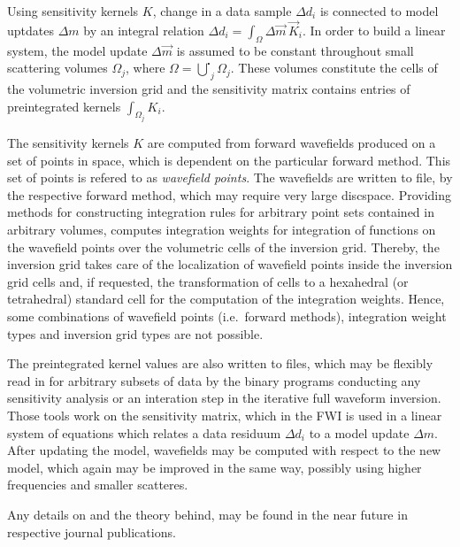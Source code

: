 Using sensitivity kernels $K$, change in a data sample $\Delta d_i$ is connected to model uptdates $\Delta m$ by 
an integral relation $\Delta d_i = \int_{\Omega} \Delta \vec{m} \, \vec{K}_i$. In order to build a linear 
system, the model update $\Delta \vec{m}$ is assumed to be constant throughout small scattering volumes 
$\Omega_j$, where $\Omega = \overset{\centerdot}{\bigcup}_j \Omega_j$. These volumes constitute the cells of the volumetric 
inversion grid and the sensitivity matrix contains entries of preintegrated kernels $\int_{\Omega_j} K_i$.

The sensitivity kernels $K$ are computed from forward wavefields produced on a set of points in space, which
is dependent on the particular forward method. This set of points is refered to as \emph{wavefield points}. The 
wavefields are written to file, by the respective forward method, which may require very large discspace. 
Providing methods for constructing integration rules for arbitrary point sets contained in arbitrary volumes, 
\ASKI computes integration weights for integration of functions on the wavefield points over the volumetric
cells of the inversion grid. Thereby, the inversion grid takes care of the localization of wavefield points 
inside the inversion grid cells and, if requested, the transformation of cells to a hexahedral (or tetrahedral) standard 
cell for the computation of the integration weights. Hence, some combinations of wavefield points (i.e.\ 
forward methods), integration weight types and inversion grid types are not possible. 

The preintegrated kernel values are also written to files, which may be flexibly read in for arbitrary subsets of data
by the binary programs conducting any sensitivity analysis or an interation step in the iterative full waveform inversion.
Those tools work on the sensitivity matrix, which in the FWI is used in a linear system of equations which
relates a data residuum $\Delta d_i$ to a model update $\Delta m$. After updating the model, wavefields may be computed
with respect to the new model, which again may be improved in the same way, possibly using higher frequencies and 
smaller scatteres. 

Any details on \ASKI and the theory behind, may be found in the near future in respective journal publications. 


%
%
\newpage
